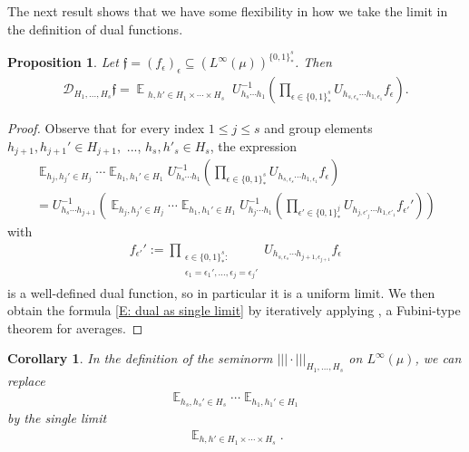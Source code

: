 \documentclass[11pt]{amsart}
\newtheorem{corollary}[lemma]{Corollary}
\newtheorem{proposition}[lemma]{Proposition}
\theoremstyle{definition}
\DeclareMathOperator*{\E}{\mathbb{E}}
\newcommand{\CD}{{\mathcal D}}
\newcommand{\eps}{\epsilon}
\newcommand{\nnorm}[1]{\lvert\!|\!| #1|\!|\!\rvert}
\newcommand{\inv}{^{-1}}
\newcommand{\1}{{\mathbf{1}}}
\newcommand{\brac}[1]{\mathopen{}\left( #1 \mathclose{}\right)}
\begin{document}
The next result shows that we have some flexibility in how we take the limit in the definition of dual functions.
\begin{proposition}\label{P: iterated limits}
     Let $\mathfrak{f} = (f_\eps)_\eps\subseteq (L^\infty(\mu))^{\{0,1\}^s_*}$. 
    Then     \begin{align}\label{E: dual as single limit}
        \CD_{H_1, \ldots, H_s}\mathfrak{f}= \E_{\substack{h,h'\in H_1 \times \cdots \times H_s}}U_{h_s\cdots h_1}\inv\brac{\prod_{\eps\in\{0,1\}^s_*}U_{h_{s,\eps_s}\cdots h_{1,\eps_1}}f_\eps}.
    \end{align}
\end{proposition}
\begin{proof}
Observe that for every index $1\leq j\leq s$ and group elements $h_{j+1}, h_{j+1}'\in H_{j+1},$ ..., $h_s,h'_s\in H_s$, the expression
    \begin{multline*}
        \E_{h_j,h_j'\in H_j}\cdots \E_{h_1,h_1'\in H_1}U_{h_s\cdots h_1}\inv\brac{\prod_{\eps\in\{0,1\}^s_*}U_{h_{s,\eps_s}\cdots h_{1,\eps_1}}f_\eps}\\
        = U_{h_s\cdots h_{j+1}}\inv \brac{\E_{h_j,h_j'\in H_j}\cdots \E_{h_1,h_1'\in H_1}U_{h_j\cdots h_1}\inv\brac{\prod_{\eps'\in\{0,1\}^j_*}U_{h_{j,\eps'_j}\cdots h_{1,\eps'_1}}f_{\eps'}'}}
    \end{multline*}
    with 
    \begin{align*}
        f_{\eps'}' := \prod_{\substack{\eps\in \{0,1\}^s_*\colon\\ \eps_1 = \eps_1',\ldots, \eps_j = \eps_j'}}U_{h_{s,\eps_s}\cdots h_{j+1,\eps_{j+1}}}f_\eps
    \end{align*}
    is a well-defined dual function, so in particular it is a uniform limit. We then obtain the formula \eqref{E: dual as single limit} by iteratively applying \cite[Theorem~1.1]{ZK16}, a Fubini-type theorem for averages. 
\end{proof}
\begin{corollary}
    In the definition of the seminorm $\nnorm{\cdot}_{H_1, \ldots, H_s}$ on $L^\infty(\mu)$, we can replace 
    \begin{align}\label{E: iterated limit}
    \E_{h_s,h_s'\in H_s}\cdots \E_{h_1,h_1'\in H_1}
\end{align}
by the single limit
\begin{align}\label{E: single limit}
\E_{h,h'\in H_1 \times \cdots \times H_s}.
\end{align}
\end{corollary}
\end{document}
